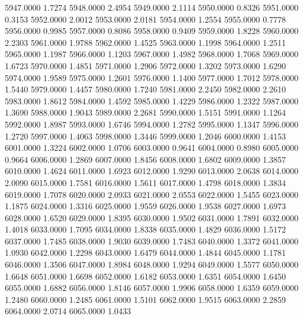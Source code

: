 5947.0000      1.7274
5948.0000      2.4954
5949.0000      2.1114
5950.0000      0.8326
5951.0000      0.3153
5952.0000      2.0012
5953.0000      2.0181
5954.0000      1.2554
5955.0000      0.7778
5956.0000      0.9985
5957.0000      0.8086
5958.0000      0.9409
5959.0000      1.8228
5960.0000      2.2303
5961.0000      1.9788
5962.0000      1.4525
5963.0000      1.1998
5964.0000      1.2511
5965.0000      1.1987
5966.0000      1.1203
5967.0000      1.4982
5968.0000      1.7068
5969.0000      1.6723
5970.0000      1.4851
5971.0000      1.2906
5972.0000      1.3202
5973.0000      1.6290
5974.0000      1.9589
5975.0000      1.2601
5976.0000      1.1400
5977.0000      1.7012
5978.0000      1.5440
5979.0000      1.4457
5980.0000      1.7240
5981.0000      2.2450
5982.0000      2.2610
5983.0000      1.8612
5984.0000      1.4592
5985.0000      1.4229
5986.0000      1.2322
5987.0000      1.3690
5988.0000      1.9043
5989.0000      2.2681
5990.0000      1.5151
5991.0000      1.1264
5992.0000      1.8987
5993.0000      1.6746
5994.0000      1.2782
5995.0000      1.1347
5996.0000      1.2720
5997.0000      1.4063
5998.0000      1.3446
5999.0000      1.2046
6000.0000      1.4153
6001.0000      1.3224
6002.0000      1.0706
6003.0000      0.9641
6004.0000      0.8980
6005.0000      0.9664
6006.0000      1.2869
6007.0000      1.8456
6008.0000      1.6802
6009.0000      1.3857
6010.0000      1.4624
6011.0000      1.6923
6012.0000      1.9290
6013.0000      2.0638
6014.0000      2.0090
6015.0000      1.7581
6016.0000      1.5611
6017.0000      1.4798
6018.0000      1.3834
6019.0000      1.7078
6020.0000      2.0933
6021.0000      2.0553
6022.0000      1.5455
6023.0000      1.1875
6024.0000      1.3316
6025.0000      1.9559
6026.0000      1.9538
6027.0000      1.6973
6028.0000      1.6520
6029.0000      1.8395
6030.0000      1.9502
6031.0000      1.7891
6032.0000      1.4018
6033.0000      1.7095
6034.0000      1.8338
6035.0000      1.4829
6036.0000      1.5172
6037.0000      1.7485
6038.0000      1.9030
6039.0000      1.7483
6040.0000      1.3372
6041.0000      1.0930
6042.0000      1.2298
6043.0000      1.6479
6044.0000      1.4844
6045.0000      1.1781
6046.0000      1.3506
6047.0000      1.8984
6048.0000      1.9294
6049.0000      1.5577
6050.0000      1.6648
6051.0000      1.6698
6052.0000      1.6182
6053.0000      1.6351
6054.0000      1.6450
6055.0000      1.6882
6056.0000      1.8146
6057.0000      1.9906
6058.0000      1.6359
6059.0000      1.2480
6060.0000      1.2485
6061.0000      1.5101
6062.0000      1.9515
6063.0000      2.2859
6064.0000      2.0714
6065.0000      1.0433
